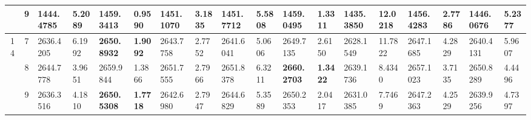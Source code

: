 \documentclass[conference]{IEEEtran}
\begin{document}
\begin{table*}[]
\begin{tabular}{|cc|ll|ll|ll|ll|ll|ll|ll|ll|}
		\multicolumn{1}{|c|}{}                            & 9                               & \multicolumn{1}{l|}{1444.4785}         & 5.2089                            & \multicolumn{1}{l|}{\textbf{1459.3413}} & \textbf{0.9590}                   & \multicolumn{1}{l|}{1451.1070}         & 3.1835                            & \multicolumn{1}{l|}{1451.7712}         & 5.5808                            & \multicolumn{1}{l|}{1459.0495}          & 1.3311                            & \multicolumn{1}{l|}{1435.3850}         & 12.0218                           & \multicolumn{1}{l|}{1456.4283}         & 2.7786                            & \multicolumn{1}{l|}{1446.0676}         & 5.2377                            \\ \hline
		\multicolumn{1}{|c|}{\multirow{3}{*}{14}}         & 7                               & \multicolumn{1}{l|}{2636.4205}         & 6.1992                            & \multicolumn{1}{l|}{\textbf{2650.8932}} & \textbf{1.9092}                   & \multicolumn{1}{l|}{2643.7758}         & 2.7752                            & \multicolumn{1}{l|}{2641.6041}         & 5.0606                            & \multicolumn{1}{l|}{2649.7135}          & 2.6150                            & \multicolumn{1}{l|}{2628.1549}         & 11.7822                           & \multicolumn{1}{l|}{2647.1685}         & 4.2829                            & \multicolumn{1}{l|}{2640.4131}         & 5.9607                            \\ \cline{2-18} 
		\multicolumn{1}{|c|}{}                            & 8                               & \multicolumn{1}{l|}{2644.7778}         & 3.9651                            & \multicolumn{1}{l|}{2659.9844}          & 1.3866                            & \multicolumn{1}{l|}{2651.7555}         & 2.7966                            & \multicolumn{1}{l|}{2651.8378}         & 6.3211                            & \multicolumn{1}{l|}{\textbf{2660.2703}} & \textbf{1.3422}                   & \multicolumn{1}{l|}{2639.1736}         & 8.4340                            & \multicolumn{1}{l|}{2657.1023}         & 3.7135                            & \multicolumn{1}{l|}{2650.8289}         & 4.4496                            \\ \cline{2-18} 
		\multicolumn{1}{|c|}{}                            & 9                               & \multicolumn{1}{l|}{2636.3516}         & 4.1810                            & \multicolumn{1}{l|}{\textbf{2650.5308}} & \textbf{1.7718}                   & \multicolumn{1}{l|}{2642.6980}         & 2.7947                            & \multicolumn{1}{l|}{2644.6829}         & 5.3589                            & \multicolumn{1}{l|}{2650.2353}          & 2.0417                            & \multicolumn{1}{l|}{2631.0385}         & 7.7469                            & \multicolumn{1}{l|}{2647.2363}         & 4.2529                            & \multicolumn{1}{l|}{2639.9256}         & 4.7397                            \\ \hline

\end{tabular}
\end{table*}
\end{document}
